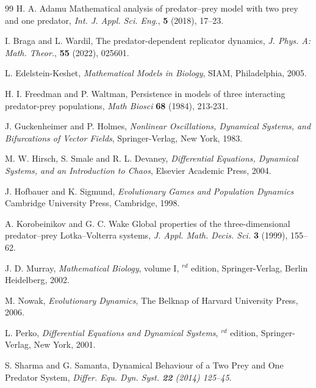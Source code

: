 \documentclass[12pt]{article}
\theoremstyle{definition}
\begin{document}
\begin{thebibliography}{99}
	 H. A. Adamu
	\newblock Mathematical analysis of predator–prey model with two prey and one predator,
	\newblock \emph{Int. J. Appl. Sci. Eng.}, \textbf{5} (2018), 17–23.
	
	\newblock I. Braga and L. Wardil,
	\newblock The predator-dependent replicator dynamics,
	\newblock \emph{J. Phys. A: Math. Theor.}, \textbf{55} (2022), 025601.
	
	\newblock L. Edelstein-Keshet,
	\newblock \emph{Mathematical Models in Biology},
	\newblock SIAM, Philadelphia, 2005.
	
	\newblock H. I. Freedman and P. Waltman,
	\newblock Persistence in models of three interacting predator-prey populations,
	\newblock \emph{Math Biosci} \textbf{68} (1984), 213-231.
	
	\newblock J. Guckenheimer and P. Holmes,
	\newblock \emph{Nonlinear Oscillations, Dynamical Systems, and Bifurcations of Vector Fields}, 
	\newblock Springer-Verlag, New York, 1983.
	
	\newblock M. W. Hirsch, S. Smale and R. L. Devaney,
	\newblock \emph{Differential Equations, Dynamical Systems, and an Introduction to Chaos}, 
	\newblock Elsevier Academic Press, 2004.
	
	\newblock J. Hofbauer and K. Sigmund,
	\newblock \emph{Evolutionary Games and Population Dynamics}
	\newblock Cambridge University Press, Cambridge, 1998.
	
	 A. Korobeinikov and G. C. Wake 
	\newblock Global properties of the three-dimensional predator–prey Lotka–Volterra systems, 
	\newblock \emph{J. Appl. Math. Decis. Sci.} \textbf{3} (1999), 155–62.
	
	\newblock J. D. Murray,
	\newblock \emph{Mathematical Biology}, volume I,
	$^{rd}$ edition, Springer-Verlag, Berlin Heidelberg, 2002.
	
	\newblock M. Nowak, \newblock \emph{Evolutionary Dynamics},
	\newblock The Belknap of
	Harvard University Press, 2006.
	
	\newblock L. Perko,
	\newblock \emph{Differential Equations and Dynamical Systems},
	$^{rd}$ edition, Springer-Verlag, New York, 2001.
	
	 S. Sharma and G. Samanta,
	\newblock Dynamical Behaviour of a Two Prey and One Predator System, 
	\newblock \emph{Differ. Equ. Dyn. Syst. \textbf{22} (2014) 125–45}.
	

\end{thebibliography}
\end{document}
